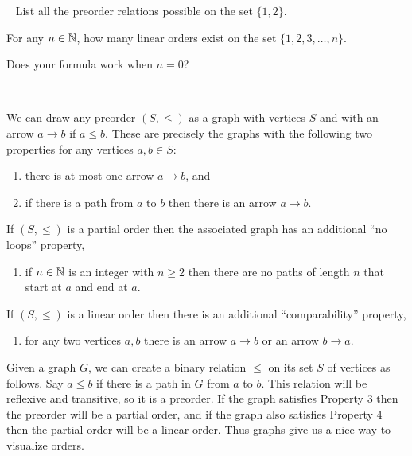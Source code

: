 \begin{exerciseRUS}
\end{exerciseRUS}

\begin{exerciseENG}~
\sexc List all the preorder relations possible on the set $\{1,2\}$.
\item For any $n\in{\mathbb N}$, how many linear orders exist on the set $\{1,2,3,\ldots,n\}$. 
\item Does your formula work when $n=0$?
\endsexc
\end{exerciseENG}

\begin{exerciseRUS}~
\end{exerciseRUS}

\begin{remarkENG}\label{rem:preorder to graph}
We can draw any preorder $(S,\leq)$ as a graph with vertices $S$ and with an arrow $a\to b$ if $a\leq b$. These are precisely the graphs with the following two properties for any vertices $a,b\in S$:
\begin{enumerate}[\hsp 1.]
\item there is at most one arrow $a\to b$, and
\item if there is a path from $a$ to $b$ then there is an arrow $a\to b$.
\end{enumerate}
If $(S,\leq)$ is a partial order then the associated graph has an additional “no loops” property,
\begin{enumerate}[\hsp 3.]
\item if $n\in{\mathbb N}$ is an integer with $n\geq 2$ then there are no paths of length $n$ that start at $a$ and end at $a$.
\end{enumerate}
If $(S,\leq)$ is a linear order then there is an additional “comparability” property,
\begin{enumerate}[\hsp 4.]
\item for any two vertices $a,b$ there is an arrow $a\to b$ or an arrow $b\to a$.
\end{enumerate}

Given a graph $G$, we can create a binary relation $\leq$ on its set $S$ of vertices as follows. Say $a\leq b$ if there is a path in $G$ from $a$ to $b$. This relation will be reflexive and transitive, so it is a preorder. If the graph satisfies Property 3 then the preorder will be a partial order, and if the graph also satisfies Property 4 then the partial order will be a linear order. Thus graphs give us a nice way to visualize orders.
\end{remarkENG}

